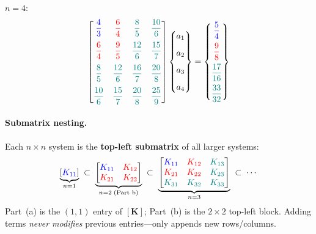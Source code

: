 \documentclass[11pt, a4paper]{article}
\begin{document}
$n=4$:
\[
\begin{bmatrix}
\textcolor{blue}{\dfrac{4}{3}} & \textcolor{red}{\dfrac{6}{4}} & \textcolor{teal}{\dfrac{8}{5}} & \textcolor{teal}{\dfrac{10}{6}}\\[10pt]
\textcolor{red}{\dfrac{6}{4}} & \textcolor{red}{\dfrac{9}{5}} & \textcolor{teal}{\dfrac{12}{6}} & \textcolor{teal}{\dfrac{15}{7}}\\[10pt]
\textcolor{teal}{\dfrac{8}{5}} & \textcolor{teal}{\dfrac{12}{6}} & \textcolor{teal}{\dfrac{16}{7}} & \textcolor{teal}{\dfrac{20}{8}}\\[10pt]
\textcolor{teal}{\dfrac{10}{6}} & \textcolor{teal}{\dfrac{15}{7}} & \textcolor{teal}{\dfrac{20}{8}} & \textcolor{teal}{\dfrac{25}{9}}
\end{bmatrix}
\begin{Bmatrix}a_1\\[8pt]a_2\\[8pt]a_3\\[8pt]a_4\end{Bmatrix}
=\begin{Bmatrix}\textcolor{blue}{\dfrac{5}{4}}\\[8pt]\textcolor{red}{\dfrac{9}{8}}\\[8pt]\textcolor{teal}{\dfrac{17}{16}}\\[8pt]\textcolor{teal}{\dfrac{33}{32}}\end{Bmatrix}
\]

\paragraph{Submatrix nesting.}
Each $n\times n$ system is the \textbf{top-left submatrix} of all larger systems:
\[
\underbrace{[\textcolor{blue}{K_{11}}]}_{n=1}
\;\subset\;
\underbrace{\begin{bmatrix}
\textcolor{blue}{K_{11}} & \textcolor{red}{K_{12}}\\
\textcolor{red}{K_{21}} & \textcolor{red}{K_{22}}
\end{bmatrix}}_{n=2\;\text{(Part b)}}
\;\subset\;
\underbrace{\begin{bmatrix}
\textcolor{blue}{K_{11}} & \textcolor{red}{K_{12}} & \textcolor{teal}{K_{13}}\\
\textcolor{red}{K_{21}} & \textcolor{red}{K_{22}} & \textcolor{teal}{K_{23}}\\
\textcolor{teal}{K_{31}} & \textcolor{teal}{K_{32}} & \textcolor{teal}{K_{33}}
\end{bmatrix}}_{n=3}
\;\subset\;\cdots
\]
Part~(a) is the $(1,1)$ entry of $[\mathbf{K}]$; Part~(b) is the $2\times 2$ top-left block.
Adding terms \emph{never modifies} previous entries---only appends new rows/columns.
\end{document}
